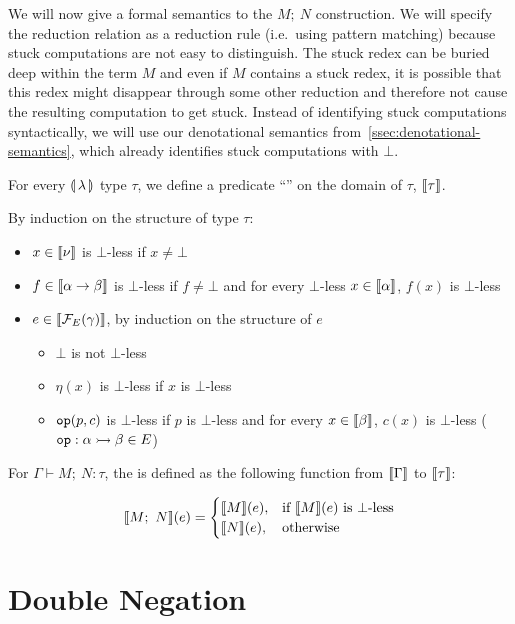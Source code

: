 We will now give a formal semantics to the $M;\ N$ construction. We will
specify the reduction relation as a reduction rule (i.e.\ using pattern
matching) because stuck computations are not easy to distinguish. The stuck
redex can be buried deep within the term $M$ and even if $M$ contains a
stuck redex, it is possible that this redex might disappear through some
other reduction and therefore not cause the resulting computation to get
stuck. Instead of identifying stuck computations syntactically, we will use
our denotational semantics from~\ref{ssec:denotational-semantics}, which
already identifies stuck computations with $\bot$.

\begin{definition}
  For every $\llparenthesis \, \lambda \, \rrparenthesis$ type $\tau$, we define a predicate
  ``'' on the domain of $\tau$, $\llbracket \tau \rrbracket$.

  By induction on the structure of type $\tau$:

  \begin{itemize}
  \item $x \in \llbracket \nu \rrbracket$ is $\bot$-less if $x \neq \bot$
  \item $f \in \llbracket \alpha \to \beta \rrbracket$ is $\bot$-less if $f \neq \bot$ and
    for every $\bot$-less $x \in \llbracket \alpha \rrbracket$, $f(x)$ is $\bot$-less
  \item $e \in \llbracket \mathcal{F}_E(\gamma) \rrbracket$, by induction on the structure of $e$
    \begin{itemize}
    \item $\bot$ is not $\bot$-less
    \item $\eta(x)$ is $\bot$-less if $x$ is $\bot$-less
    \item $\mathtt{op}(p, c)$ is $\bot$-less if $p$ is $\bot$-less and for
      every $x \in \llbracket \beta \rrbracket$, $c(x)$ is $\bot$-less
      ($\mathtt{op} : \alpha \rightarrowtail \beta \in E$)
    \end{itemize}
  \end{itemize}
\end{definition}

\begin{definition}
  For $\Gamma \vdash M;\ N : \tau$, the  is defined as the following function from $\llbracket \Gamma \rrbracket$
  to $\llbracket \tau \rrbracket$:

  $$
  \llbracket M;\ N \rrbracket(e) = \begin{cases}
    \llbracket M \rrbracket(e), & \text{if $\llbracket M \rrbracket(e)$ is $\bot$-less} \\
    \llbracket N \rrbracket(e), & \text{otherwise}
  \end{cases}
  $$
\end{definition}


\section{Double Negation}
\label{sec:double-negation}

